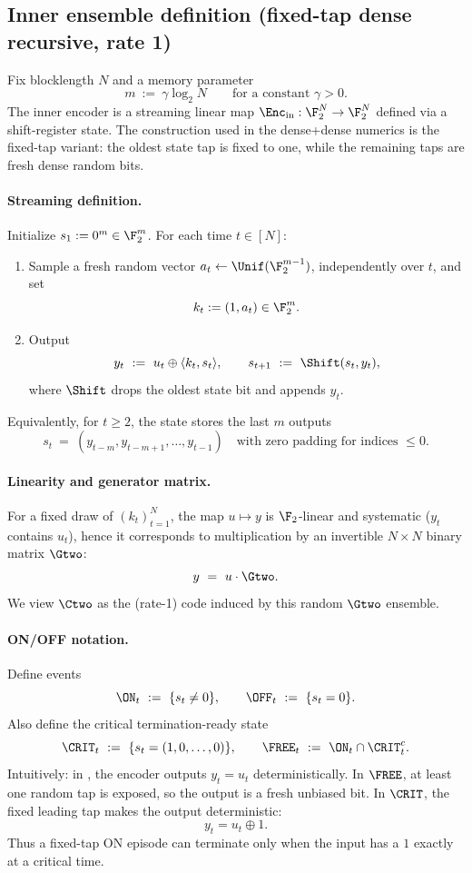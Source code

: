 \subsection{Inner ensemble definition (fixed-tap dense recursive, rate 1)}
\label{subsec:inner-dense-def}

Fix blocklength $N$ and a memory parameter
\[
m \ :=\ \gamma \log_2 N
\qquad\text{for a constant }\gamma>0.
\]
The inner encoder is a streaming linear map $\Enc_{\mathrm{in}}:\F_2^N\to\F_2^N$ defined via a shift-register state.
The construction used in the dense+dense numerics is the fixed-tap variant: the oldest state tap is fixed to one,
while the remaining taps are fresh dense random bits.

\paragraph{Streaming definition.}
Initialize $s_1:=0^m\in\F_2^m$.
For each time $t\in[N]$:
\begin{enumerate}
\item Sample a fresh random vector \(a_t\gets\Unif(\F_2^{m-1})\), independently over \(t\), and set
\[
k_t := (1,a_t)\in \F_2^m.
\]
\item Output
\begin{equation}
\label{eq:dense-inner-def}
y_t \ :=\ u_t \oplus \langle k_t, s_t\rangle,
\qquad
s_{t+1}\ :=\ \Shift(s_t,y_t),
\end{equation}
where $\Shift$ drops the oldest state bit and appends $y_t$.
\end{enumerate}
Equivalently, for $t\ge 2$, the state stores the last $m$ outputs
\[
s_t \ =\ (y_{t-m},y_{t-m+1},\dots,y_{t-1})
\quad\text{with zero padding for indices }\le 0.
\]

\paragraph{Linearity and generator matrix.}
For a fixed draw of $(k_t)_{t=1}^N$, the map $u\mapsto y$ is $\F_2$-linear and systematic ($y_t$ contains $u_t$),
hence it corresponds to multiplication by an invertible $N\times N$ binary matrix $\Gtwo$:
\[
y \ =\ u \cdot \Gtwo.
\]
We view $\Ctwo$ as the (rate-1) code induced by this random $\Gtwo$ ensemble.

\paragraph{ON/OFF notation.}
Define events
\[
\ON_t \ :=\ \{s_t\neq 0\},
\qquad
\OFF_t\ :=\ \{s_t=0\}.
\]
Also define the critical termination-ready state
\[
\CRIT_t \ :=\ \{s_t=(1,0,\dots,0)\},
\qquad
\FREE_t \ :=\ \ON_t\cap \CRIT_t^c.
\]
Intuitively: in \OFF, the encoder outputs $y_t=u_t$ deterministically. In \(\FREE\), at least one random tap is exposed,
so the output is a fresh unbiased bit. In \(\CRIT\), the fixed leading tap makes the output deterministic:
\[
y_t = u_t\oplus 1.
\]
Thus a fixed-tap ON episode can terminate only when the input has a \(1\) exactly at a critical time.

